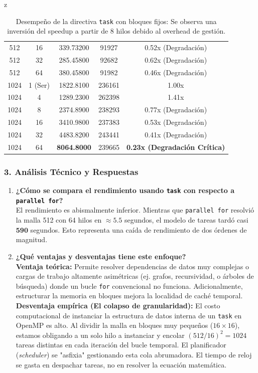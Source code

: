 z\documentclass[11pt,a4paper]{article}
\begin{document}
\begin{table}[H]
\begin{tabular}{|c|c|c|c|c|}
512 & 16 & 339.73200 & 91927 & 0.52x (Degradación) \\ 
512 & 32 & 285.45800 & 92682 & 0.62x (Degradación) \\ 
512 & 64 & 380.45800 & 91982 & 0.46x (Degradación) \\ \hline
1024 & 1 (Ser) & 1822.8100 & 236161 & 1.00x \\ 
1024 & 4 & 1289.2300 & 262398 & 1.41x \\ 
1024 & 8 & 2374.8900 & 238293 & 0.77x (Degradación) \\ 
1024 & 16 & 3410.9800 & 237383 & 0.53x (Degradación) \\ 
1024 & 32 & 4483.8200 & 243441 & 0.41x (Degradación) \\ 
1024 & 64 & \textbf{8064.8000} & 239665 & \textbf{0.23x (Degradación Crítica)} \\ \hline
\end{tabular}
\caption{Desempeño de la directiva \texttt{task} con bloques fijos: Se observa una inversión del speedup a partir de 8 hilos debido al overhead de gestión.}
\label{tab:resultados_task_v2}
\end{table}

\subsubsection*{3. Análisis Técnico y Respuestas}

\begin{enumerate}
    \item \textbf{¿Cómo se compara el rendimiento usando \texttt{task} con respecto a \texttt{parallel for}?} \\
    El rendimiento es abismalmente inferior. Mientras que \texttt{parallel for} resolvió la malla 512 con 64 hilos en $\approx 5.5$ segundos, el modelo de tareas tardó casi $\mathbf{590}$ segundos. Esto representa una caída de rendimiento de dos órdenes de magnitud. 

    \item \textbf{¿Qué ventajas y desventajas tiene este enfoque?} \\
    \textbf{Ventaja teórica:} Permite resolver dependencias de datos muy complejas o cargas de trabajo altamente asimétricas (ej. grafos, recursividad, o árboles de búsqueda) donde un bucle \texttt{for} convencional no funciona. Adicionalmente, estructurar la memoria en bloques mejora la localidad de caché temporal.\\
    \textbf{Desventaja empírica (El colapso de granularidad):} El costo computacional de instanciar la estructura de datos interna de un \texttt{task} en OpenMP es alto. Al dividir la malla en bloques muy pequeños ($16 \times 16$), estamos obligando a un solo hilo a instanciar y encolar $(512/16)^2 = 1024$ tareas distintas en cada iteración del bucle temporal. El planificador (\textit{scheduler}) se "asfixia" gestionando esta cola abrumadora. El tiempo de reloj se gasta en despachar tareas, no en resolver la ecuación matemática.
\end{enumerate}
\end{document}
